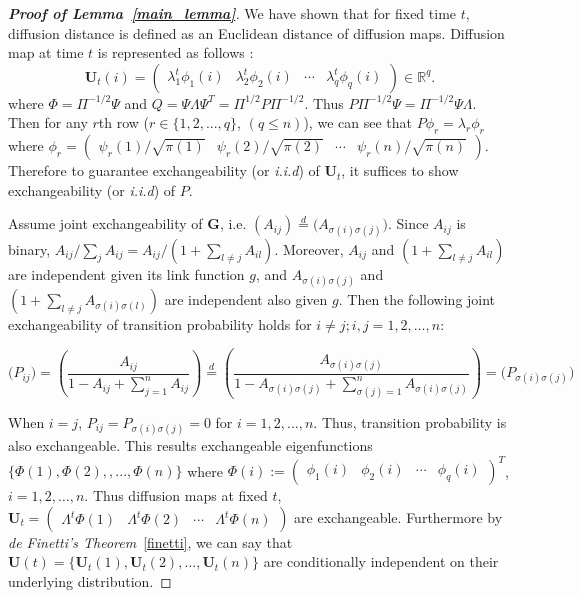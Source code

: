 \documentclass[12pt]{article}
\theoremstyle{definition}
\begin{document}
	
\begin{proof}[\textbf{Proof of Lemma~\ref{main_lemma}}]
We have shown that for fixed time $t$, diffusion distance is defined as an Euclidean distance of diffusion maps. Diffusion map at time $t$ is represented as follows :
\begin{equation}
	\mathbf{U}_{t}(i) = \begin{pmatrix} \lambda^{t}_{1} \phi_{1}(i) & \lambda^{t}_{2} \phi_{2} (i)  & \cdots & \lambda^{t}_{q} \phi_{q}(i) \end{pmatrix} \in \mathbb{R}^{q}.
\end{equation}
where $\Phi = \Pi^{-1/2}\Psi$ and $Q= \Psi \Lambda \Psi^{T} = \Pi^{1/2} P \Pi^{-1/2}$. 
Thus $P \Pi^{-1/2} \Psi = \Pi^{-1/2} \Psi \Lambda$. 
Then for any $r$th row ($r \in \{1,2, ... , q \}$, $(q \leq n)$), we can see that $P \phi_{r} = \lambda_{r} \phi_{r}$  where $\phi_{r} = \begin{pmatrix}  \psi_{r}(1) / \sqrt{\pi(1)} &  \psi_{r}(2) /  \sqrt{\pi(2)} & \cdots & \psi_{r}(n) /  \sqrt{\pi(n)}  \end{pmatrix}$.
Therefore to guarantee exchangeability (or \textit{i.i.d}) of $\mathbf{U}_{t}$, it suffices to show exchangeability (or \textit{i.i.d}) of $P$.

Assume joint exchangeability of $\mathbf{G}$, i.e. $(A_{ij}) \stackrel{d}{=} \big( A_{\sigma(i) \sigma(j)} \big)$. Since $A_{ij}$ is binary, $A_{ij} / \sum\limits_{j} A_{ij} = A_{ij} /  (1 + \sum\limits_{l \neq j} A_{il})$. Moreover, $A_{ij}$ and $(1 + \sum\limits_{l \neq j} A_{il})$ are independent given its link function $g$, and $A_{\sigma(i) \sigma(j)}$ and $(1 + \sum\limits_{l \neq j} A_{\sigma(i) \sigma(l)})$ are independent also given $g$.
Then the following joint exchangeability of transition probability holds for $i \neq j; i,j = 1,2, \ldots,n$:

\begin{equation}
\big( P_{ij} \big) = \left(  \frac{A_{ij}}{1 - A_{ij} + \sum\limits_{j=1}^{n} A_{ij} } \right)  \stackrel{d}{=} \left( \frac{A_{\sigma(i) \sigma(j)} }{1 - A_{\sigma(i) \sigma(j)} + \sum\limits_{\sigma(j) = 1}^{n} A_{\sigma(i) \sigma(j)} } \right) = \big( P_{\sigma(i) \sigma(j)} \big)
\end{equation}
		
When $i = j$, $P_{ij} = P_{\sigma(i) \sigma(j)} = 0$ for $i=1,2, \ldots, n$. Thus, transition probability is also exchangeable. This results exchangeable eigenfunctions $\{ \Phi(1), \Phi(2), , ... , \Phi(n) \}$ where $\Phi(i) := \begin{pmatrix} \phi_{1}(i) & \phi_{2}(i) & \cdots & \phi_{q}(i) \end{pmatrix}^{T}$, $i=1,2, \ldots, n$. Thus diffusion maps at fixed $t$, $\mathbf{U}_{t} = \begin{pmatrix} \Lambda^{t} \Phi(1)  & \Lambda^{t} \Phi(2) & \cdots & \Lambda^{t} \Phi(n)  \end{pmatrix}$ are exchangeable. Furthermore by \textit{de Finetti's Theorem}~\ref{finetti}, we can say that $\mathbf{U}(t) = \{ \mathbf{U}_{t}(1), \mathbf{U}_{t}(2), \ldots, \mathbf{U}_{t}(n)    \}$ are conditionally independent on their underlying distribution.
\end{proof}
	
\end{document}
